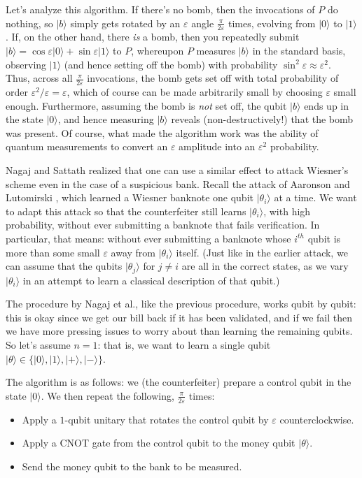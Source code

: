 \documentclass[11pt]{report}
\theoremstyle{plain}
\theoremstyle{definition}
\newcommand{\eps}{\varepsilon}
\renewcommand{\ket}[1]{|#1\rangle}
\begin{document}
Let's analyze this algorithm.  If there's no bomb, then the invocations of $P$ do nothing, so $\ket{b}$ simply gets rotated by an $\eps$ angle $\frac{\pi}{2 \eps}$ times, evolving from $\ket{0}$ to $\ket{1}$.  If, on the other hand, there {\em is} a bomb, then you repeatedly submit $\ket{b} = \cos\eps \ket{0} + \sin\eps \ket{1}$ to $P$, whereupon $P$ measures $\ket{b}$ in the standard basis, observing $\ket{1}$ (and hence setting off the bomb) with probability $\sin^2 \eps \approx \eps^2$.  Thus, across all $\frac{\pi}{2 \eps}$ invocations, the bomb gets set off with total probability of order $\eps^2 / \eps = \eps$, which of course can be made arbitrarily small by choosing $\eps$ small enough.  Furthermore, assuming the bomb is {\em not} set off, the qubit $\ket{b}$ ends up in the state $\ket{0}$, and hence measuring $\ket{b}$ reveals (non-destructively!) that the bomb was present.  Of course, what made the algorithm work was the ability of quantum measurements to convert an $\eps$ amplitude into an $\eps^2$ probability.

Nagaj and Sattath \cite{NS14} realized that one can use a similar effect to attack Wiesner's scheme even in the case of a suspicious bank.  Recall the attack of Aaronson \cite{Aar09} and Lutomirski \cite{lutomirski:attack}, which learned a Wiesner banknote one qubit $\ket{\theta_i}$ at a time.  We want to adapt this attack so that the counterfeiter still learns $\ket{\theta_i}$, with high probability, without ever submitting a banknote that fails verification.  In particular, that means: without ever submitting a banknote whose $i^{th}$ qubit is more than some small $\eps$ away from $\ket{\theta_i}$ itself.  (Just like in the earlier attack, we can assume that the qubits $\ket{\theta_j}$ for $j\neq i$ are all in the correct states, as we vary $\ket{\theta_i}$ in an attempt to learn a classical description of that qubit.)

The procedure by Nagaj et al., like the previous procedure, works qubit by qubit: this is okay since we get our bill back if it has been validated, and if we fail then we have more pressing issues to worry about than learning the remaining qubits.  So let's assume $n=1$: that is, we want to learn a single qubit $\ket\theta \in \{\ket 0, \ket 1, \ket +,\ket -\}$.

The algorithm is as follows: we (the counterfeiter) prepare a control qubit in the state $\ket{0}$.  We then repeat the following, $\frac{\pi}{2 \eps}$ times:

\begin{itemize}
\item Apply a $1$-qubit unitary that rotates the control qubit by $\eps$ counterclockwise.
\item Apply a CNOT gate from the control qubit to the money qubit $\ket{\theta}$.
\item Send the money qubit to the bank to be measured.
\end{itemize}
\end{document}
